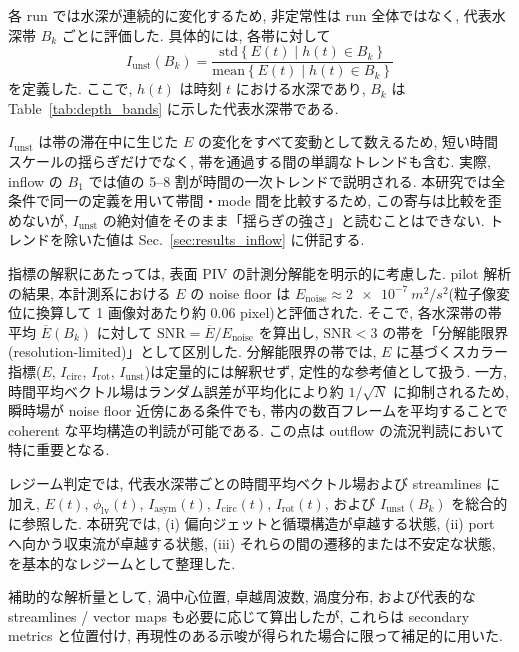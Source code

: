 各 run では水深が連続的に変化するため, 非定常性は run 全体ではなく, 代表水深帯 $B_k$ ごとに評価した. 具体的には, 各帯に対して
\begin{equation}
I_{\mathrm{unst}}(B_k)=
\frac{\mathrm{std}\left\{E(t)\mid h(t)\in B_k\right\}}
{\mathrm{mean}\left\{E(t)\mid h(t)\in B_k\right\}}
\label{eq:Iunst}
\end{equation}
を定義した. ここで, $h(t)$ は時刻 $t$ における水深であり, $B_k$ は Table~\ref{tab:depth_bands} に示した代表水深帯である.

$I_{\mathrm{unst}}$ は帯の滞在中に生じた $E$ の変化をすべて変動として数えるため, 短い時間スケールの揺らぎだけでなく, 帯を通過する間の単調なトレンドも含む. 実際, inflow の $B_1$ では値の 5--8 割が時間の一次トレンドで説明される. 本研究では全条件で同一の定義を用いて帯間・mode 間を比較するため, この寄与は比較を歪めないが, $I_{\mathrm{unst}}$ の絶対値をそのまま「揺らぎの強さ」と読むことはできない. トレンドを除いた値は Sec.~\ref{sec:results_inflow} に併記する.

指標の解釈にあたっては, 表面 PIV の計測分解能を明示的に考慮した. pilot 解析の結果, 本計測系における $E$ の noise floor は $E_{\mathrm{noise}} \approx \SI{2e-7}{m^2/s^2}$(粒子像変位に換算して 1 画像対あたり約 0.06 pixel)と評価された. そこで, 各水深帯の帯平均 $\overline{E}(B_k)$ に対して $\mathrm{SNR} = \overline{E}/E_{\mathrm{noise}}$ を算出し, $\mathrm{SNR} < 3$ の帯を「分解能限界(resolution-limited)」として区別した. 分解能限界の帯では, $E$ に基づくスカラー指標($E$, $I_{\mathrm{circ}}$, $I_{\mathrm{rot}}$, $I_{\mathrm{unst}}$)は定量的には解釈せず, 定性的な参考値として扱う. 一方, 時間平均ベクトル場はランダム誤差が平均化により約 $1/\sqrt{N}$ に抑制されるため, 瞬時場が noise floor 近傍にある条件でも, 帯内の数百フレームを平均することで coherent な平均構造の判読が可能である. この点は outflow の流況判読において特に重要となる.

レジーム判定では, 代表水深帯ごとの時間平均ベクトル場および streamlines に加え, $E(t)$, $\phi_{\mathrm{lv}}(t)$, $I_{\mathrm{asym}}(t)$, $I_{\mathrm{circ}}(t)$, $I_{\mathrm{rot}}(t)$, および $I_{\mathrm{unst}}(B_k)$ を総合的に参照した. 本研究では, (i) 偏向ジェットと循環構造が卓越する状態, (ii) port へ向かう収束流が卓越する状態, (iii) それらの間の遷移的または不安定な状態, を基本的なレジームとして整理した.

補助的な解析量として, 渦中心位置, 卓越周波数, 渦度分布, および代表的な streamlines / vector maps も必要に応じて算出したが, これらは secondary metrics と位置付け, 再現性のある示唆が得られた場合に限って補足的に用いた.

